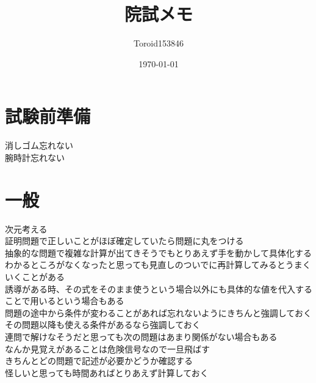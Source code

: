 \documentclass{ltjsarticle}
\title{院試メモ}
\author{Toroid153846}
\date{\today}
\begin{document}
\maketitle
  \section{試験前準備}
  消しゴム忘れない\\
  腕時計忘れない
  \section{一般}
  次元考える\\
  証明問題で正しいことがほぼ確定していたら問題に丸をつける\\
  抽象的な問題で複雑な計算が出てきそうでもとりあえず手を動かして具体化する\\
  わかるところがなくなったと思っても見直しのついでに再計算してみるとうまくいくことがある\\
  誘導がある時、その式をそのまま使うという場合以外にも具体的な値を代入することで用いるという場合もある\\
  問題の途中から条件が変わることがあれば忘れないようにきちんと強調しておく\\
  その問題以降も使える条件があるなら強調しておく\\
  連問で解けなそうだと思っても次の問題はあまり関係がない場合もある\\
  なんか見覚えがあることは危険信号なので一旦飛ばす\\
  きちんとどの問題で記述が必要かどうか確認する\\
  怪しいと思っても時間あればとりあえず計算しておく\\
\end{document}
